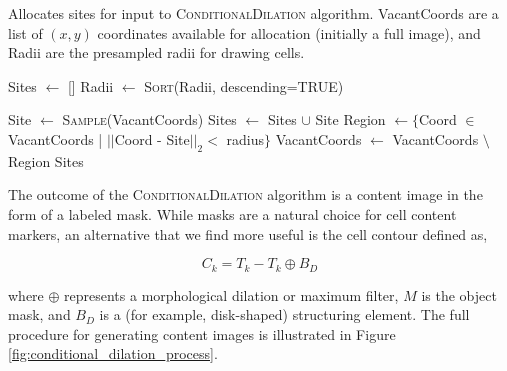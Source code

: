 \begin{algorithm}
\caption{Allocates sites for input to \textsc{ConditionalDilation} algorithm. VacantCoords are a list of $(x, y)$ coordinates available for allocation (initially a full image), and Radii are the presampled radii for drawing cells.} \label{alg:AllocateSites}
\begin{algorithmic}[1]
\State Sites $\leftarrow$ []
\State Radii $\leftarrow$ \textsc{Sort}(Radii, descending=TRUE)

	\State Site $\leftarrow$ \textsc{Sample}(VacantCoords)
	\State Sites $\leftarrow$ Sites $\cup$ Site
	\State Region $\leftarrow \{$Coord $\in$ VacantCoords | $||$Coord - Site$||_2 <$ radius$\}$
	\State VacantCoords $\leftarrow$ VacantCoords $\setminus$ Region
\EndFor
\State\Return Sites
\EndProcedure
\end{algorithmic}
\end{algorithm}

The outcome of the \textsc{ConditionalDilation} algorithm is a content image in the form of a labeled mask. While masks are a natural choice for cell content markers, an alternative that we find more useful is the cell contour defined as,

\begin{equation}
C_k = T_k - T_k \oplus B_D
\label{eq:contour}
\end{equation}

where $\oplus$ represents a morphological dilation or maximum filter, $M$ is the object mask, and $B_D$ is a (for example, disk-shaped) structuring element. The full procedure for generating content images is illustrated in Figure \ref{fig:conditional_dilation_process}.

